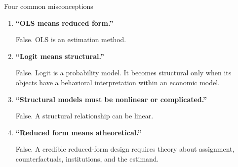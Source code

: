 \documentclass[aspectratio=169,11pt]{beamer}
\begin{document}
\begin{frame}{Four common misconceptions}

\begin{enumerate}
    \item
    \textbf{``OLS means reduced form.''}

    False. OLS is an estimation method.

    \vspace{0.2em}

    \item
    \textbf{``Logit means structural.''}

    False. Logit is a probability model.
    It becomes structural only when its objects have a behavioral
    interpretation within an economic model.

    \vspace{0.2em}

    \item
    \textbf{``Structural models must be nonlinear or complicated.''}

    False. A structural relationship can be linear.

    \vspace{0.2em}

    \item
    \textbf{``Reduced form means atheoretical.''}

    False. A credible reduced-form design requires theory about
    assignment, counterfactuals, institutions, and the estimand.
\end{enumerate}

\end{frame}
\end{document}
